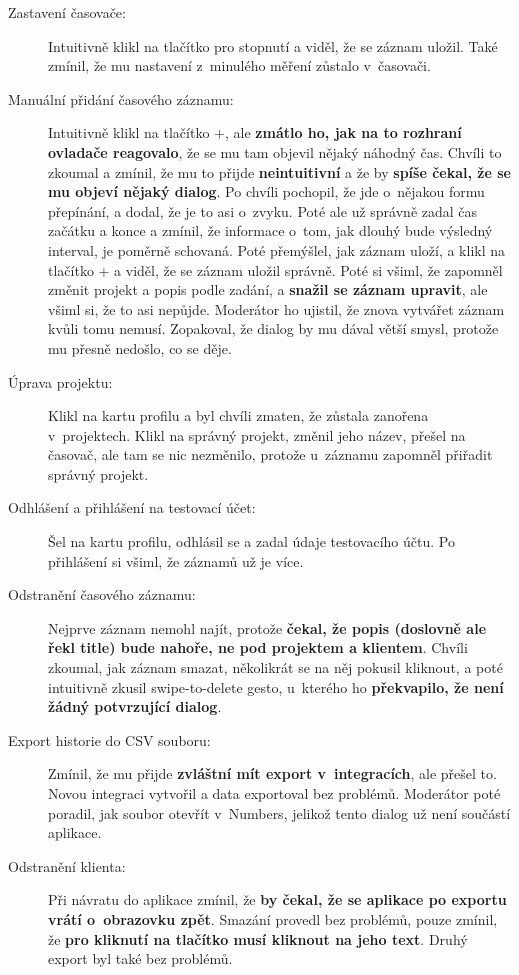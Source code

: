 \begin{description}
\item[Zastavení časovače:] Intuitivně klikl na tlačítko pro stopnutí a viděl, že se záznam uložil. Také zmínil, že mu nastavení z~minulého měření zůstalo v~časovači.
\item[Manuální přidání časového záznamu:] Intuitivně klikl na tlačítko +, ale \textbf{zmátlo ho, jak na to rozhraní ovladače reagovalo}, že se mu tam objevil nějaký náhodný čas. Chvíli to zkoumal a zmínil, že mu to přijde \textbf{neintuitivní} a že by \textbf{spíše čekal, že se mu objeví nějaký dialog}. Po chvíli pochopil, že jde o~nějakou formu přepínání, a dodal, že je to asi o~zvyku. Poté ale už správně zadal čas začátku a konce a zmínil, že informace o~tom, jak dlouhý bude výsledný interval, je poměrně schovaná. Poté přemýšlel, jak záznam uloží, a klikl na tlačítko + a viděl, že se záznam uložil správně. Poté si všiml, že zapomněl změnit projekt a popis podle zadání, a \textbf{snažil se záznam upravit}, ale všiml si, že to asi nepůjde. Moderátor ho ujistil, že znova vytvářet záznam kvůli tomu nemusí. Zopakoval, že dialog by mu dával větší smysl, protože mu přesně nedošlo, co se děje.
\item[Úprava projektu:] Klikl na kartu profilu a byl chvíli zmaten, že zůstala zanořena v~projektech. Klikl na správný projekt, změnil jeho název, přešel na časovač, ale tam se nic nezměnilo, protože u~záznamu zapomněl přiřadit správný projekt. 
\item[Odhlášení a přihlášení na testovací účet:] Šel na kartu profilu, odhlásil se a zadal údaje testovacího účtu. Po přihlášení si všiml, že záznamů už je více.
\item[Odstranění časového záznamu:] Nejprve záznam nemohl najít, protože \textbf{čekal, že popis (doslovně ale řekl title) bude nahoře, ne pod projektem a klientem}. Chvíli zkoumal, jak záznam smazat, několikrát se na něj pokusil kliknout, a poté intuitivně zkusil swipe-to-delete gesto, u~kterého ho \textbf{překvapilo, že není žádný potvrzující dialog}.
\item[Export historie do CSV souboru:] Zmínil, že mu přijde \textbf{zvláštní mít export v~integracích}, ale přešel to. Novou integraci vytvořil a data exportoval bez problémů. Moderátor poté poradil, jak soubor otevřít v~Numbers, jelikož tento dialog už není součástí aplikace.
\item[Odstranění klienta:] Při návratu do aplikace zmínil, že \textbf{by čekal, že se aplikace po exportu vrátí o~obrazovku zpět}. Smazání provedl bez problémů, pouze zmínil, že \textbf{pro kliknutí na tlačítko musí kliknout na jeho text}. Druhý export byl také bez problémů.

\end{description}
